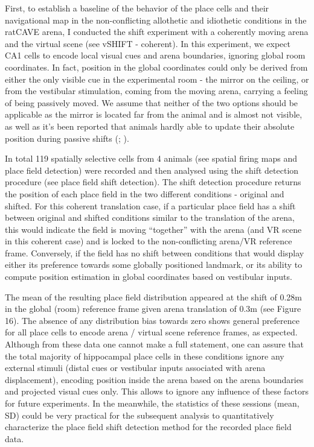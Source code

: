 First, to establish a baseline of the behavior of the place cells and their navigational map in the non-conflicting allothetic and idiothetic conditions in the ratCAVE arena, I conducted the shift experiment with a coherently moving arena and the virtual scene (see vSHIFT - coherent). In this experiment, we expect CA1 cells to encode local visual cues and arena boundaries, ignoring global room coordinates. In fact, position in the global coordinates could only be derived from either the only visible cue in the experimental room - the mirror on the ceiling, or from the vestibular stimulation, coming from the moving arena, carrying a feeling of being passively moved. We assume that neither of the two options should be applicable as the mirror is located far from the animal and is almost not visible, as well as it’s been reported that animals hardly able to update their absolute position during passive shifts (\cite{Mittelstaedt1980}; \cite{Etienne1988}).

In total 119 spatially selective cells from 4 animals (see spatial firing maps and place field detection) were recorded and then analysed using the shift detection procedure (see place field shift detection). The shift detection procedure returns the position of each place field in the two different conditions - original and shifted. For this coherent translation case, if a particular place field has a shift between original and shifted conditions similar to the translation of the arena, this would indicate the field is moving “together” with the arena (and VR scene in this coherent case) and is locked to the non-conflicting arena/VR reference frame. Conversely, if the field has no shift between conditions that would display either its preference towards some globally positioned landmark, or its ability to compute  position estimation in global coordinates based on vestibular inputs.

The mean of the resulting place field distribution appeared at the shift of 0.28m in the global (room) reference frame given arena translation of 0.3m (see Figure 16). The absence of any distribution bias towards zero shows general preference for all place cells to encode arena / virtual scene reference frames, as expected. Although from these data one cannot make a full statement, one can assure that the total majority of hippocampal place cells in these conditions ignore any external stimuli (distal cues or vestibular inputs associated with arena displacement), encoding position inside the arena based on the arena boundaries and projected visual cues only. This allows to ignore any influence of these factors for future experiments. In the meanwhile, the statistics of these sessions (mean, SD) could be very practical for the subsequent analysis to quantitatively characterize the place field shift detection method for the recorded place field data.

